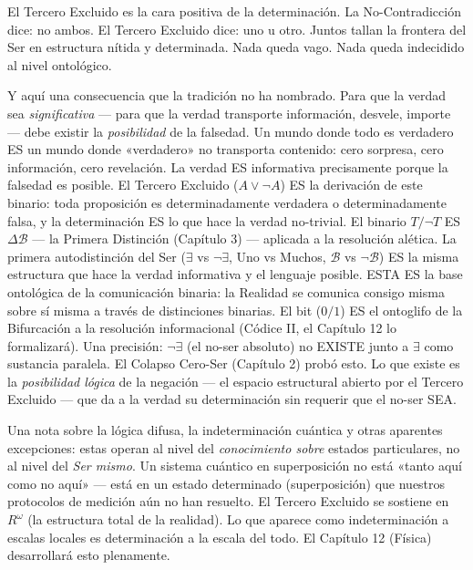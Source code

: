 \documentclass[10pt, openany, oneside]{book}
\begin{document}
\vspace{0.8em}

\noindent El Tercero Excluido es la cara positiva de la determinación. La No-Contradicción dice: no ambos. El Tercero Excluido dice: uno u otro. Juntos tallan la frontera del Ser en estructura nítida y determinada. Nada queda vago. Nada queda indecidido al nivel ontológico.

Y aquí una consecuencia que la tradición no ha nombrado. Para que la verdad sea \textit{significativa} --- para que la verdad transporte información, desvele, importe --- debe existir la \textit{posibilidad} de la falsedad. Un mundo donde todo es verdadero ES un mundo donde «verdadero» no transporta contenido: cero sorpresa, cero información, cero revelación. La verdad ES informativa precisamente porque la falsedad es posible. El Tercero Excluido ($A \vee \neg A$) ES la derivación de este binario: toda proposición es determinadamente verdadera o determinadamente falsa, y la determinación ES lo que hace la verdad no-trivial. El binario $T/\neg T$ ES $\Delta\mathcal{B}$ --- la Primera Distinción (Capítulo 3) --- aplicada a la resolución alética. La primera autodistinción del Ser ($\exists$ vs $\neg\exists$, Uno vs Muchos, $\mathcal{B}$ vs $\neg\mathcal{B}$) ES la misma estructura que hace la verdad informativa y el lenguaje posible. ESTA ES la base ontológica de la comunicación binaria: la Realidad se comunica consigo misma sobre sí misma a través de distinciones binarias. El bit ($0/1$) ES el ontoglifo de la Bifurcación a la resolución informacional (Códice II, el Capítulo 12 lo formalizará). Una precisión: $\neg\exists$ (el no-ser absoluto) no EXISTE junto a $\exists$ como sustancia paralela. El Colapso Cero-Ser (Capítulo 2) probó esto. Lo que existe es la \textit{posibilidad lógica} de la negación --- el espacio estructural abierto por el Tercero Excluido --- que da a la verdad su determinación sin requerir que el no-ser SEA.

Una nota sobre la lógica difusa, la indeterminación cuántica y otras aparentes excepciones: estas operan al nivel del \textit{conocimiento sobre} estados particulares, no al nivel del \textit{Ser mismo}. Un sistema cuántico en superposición no está «tanto aquí como no aquí» --- está en un estado determinado (superposición) que nuestros protocolos de medición aún no han resuelto. El Tercero Excluido se sostiene en $R^\omega$ (la estructura total de la realidad). Lo que aparece como indeterminación a escalas locales es determinación a la escala del todo. El Capítulo 12 (Física) desarrollará esto plenamente.
\end{document}
